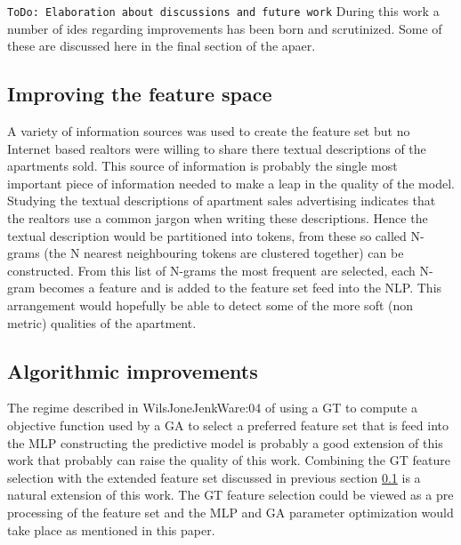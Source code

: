 \texttt{ToDo: Elaboration about discussions and future work}
During this work a number of ides regarding improvements has been born and scrutinized. Some of these are discussed here in the final section of the apaer.

\subsection{Improving the feature space}\label{discuss_improve_feature}
A variety of information sources was used to create the feature set but no Internet based realtors were willing to share there textual descriptions of the apartments sold. This source of information is probably the single most important piece of information needed to make a leap in the quality of the model. Studying the textual descriptions of apartment sales advertising indicates that the realtors use a common jargon when writing these descriptions. Hence the textual description would be partitioned into tokens, from these so called N-grams (the N nearest neighbouring tokens are clustered together) can be constructed. From this list of N-grams the most frequent are selected, each N-gram becomes a feature and is added to the feature set feed into the NLP. This arrangement would hopefully be able to detect some of the more soft (non metric) qualities of the apartment.  

\subsection{Algorithmic improvements}
The regime described in \cite{art}{WilsJoneJenkWare:04} of using a GT to compute a objective function used by a GA to select a preferred feature set that is feed into the MLP constructing the predictive model is probably a good extension of this work that probably can raise the quality of this work. Combining the GT feature selection with the extended feature set discussed in previous section \ref{discuss_improve_feature} is a natural extension of this work. The GT feature selection could be viewed as a pre processing of the feature set and the MLP and GA parameter optimization would take place as mentioned in this paper. 